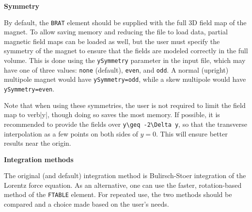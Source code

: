 {\bf Symmetry}

By default, the \verb|BRAT| element should be supplied with the full 3D field map of the magnet.
To allow saving memory and reducing the file to load data, partial magnetic field maps can be 
loaded as well, but the user must specify the symmetry of the magnet to ensure that the fields are
modeled correctly in the full volume.
This is done using the \verb|ySymmetry| parameter in the input file, which may have one of three
values: \verb|none| (default), \verb|even|, and \verb|odd|.  
A normal (upright) multipole magnet would have
\verb|ySymmetry=odd|, while a skew multipole would have \verb|ySymmetry=even|.

Note that when using these symmetries, the user is not required to limit the field map to
verb|y|, though doing so saves the most memory.
If possible, it is recommended to provide the fields over \verb|y\geq -2\Delta y|,
so that the transverse interpolation as a few points on both sides of $y=0$.
This will ensure better results near the origin.

{\bf Integration methods}

The original (and default) integration method is Bulirsch-Stoer integration of the Lorentz force equation.
As an alternative, one can use the faster, rotation-based method of the \verb|FTABLE| element.
For repeated use, the two methods should be compared and a choice made based on the user's needs.
